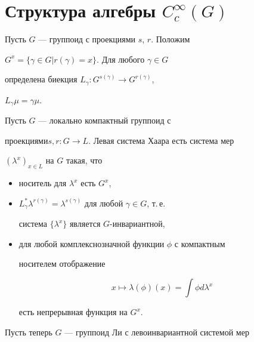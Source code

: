 \section{Структура алгебры $C^{\infty}_c(G)$}





Пусть $G$ --- группоид с проекциями $s$, $r$. Положим


$G^x=\{\gamma \in G| r(\gamma)=x\}$. Для любого $\gamma \in G$


определена биекция $L_{\gamma}: G^{s(\gamma)} \to G^{r(\gamma)}$,


$L_{\gamma} \mu= \gamma \mu$.





\begin{defnnonum}


Пусть $G$ --- локально компактный группоид с


проекциями\linebreak $s, r: G \to L$. Левая система Хаара есть система мер


$(\lambda^x)_{x \in L}$ на $G$ такая, что


\begin{itemize}


\item[1)] носитель для $\lambda^x$ есть $G^{x}$,


\item[2)] $L^*_{\gamma}


\lambda^{r(\gamma)}=\lambda^{s(\gamma)}$ для любой $\gamma \in G$, т.\,е.


система $\{\lambda^x\}$ является $G$-инвариантной,


\item[3)] для любой комплекснозначной функции $\phi$ с компактным


носителем отображение


$$


x \mapsto \lambda (\phi) (x) = \int \phi d \lambda^x


$$


есть непрерывная функция на $G^x$.


\end{itemize}


\end{defnnonum}





Пусть теперь $G$ --- группоид Ли с левоинвариантной системой мер


